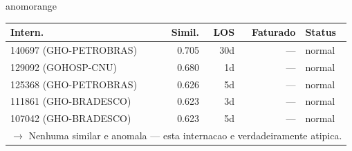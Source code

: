 \documentclass[a4paper,10pt]{article}
\begin{document}
\begin{anomalycard}[Internacao 165832 | GHO-PETROBRAS | ALTO (z=3.30)]{anomorange}
\begin{tabular}{l r r r l}\toprule\textbf{Intern.} & \textbf{Simil.} & \textbf{LOS} & \textbf{Faturado} & \textbf{Status} \\\midrule
140697 (GHO-PETROBRAS) & 0.705 & 30d & --- & \textcolor{jcubeblue}{normal} \\
129092 (GOHOSP-CNU) & 0.680 & 1d & --- & \textcolor{jcubeblue}{normal} \\
125368 (GHO-PETROBRAS) & 0.626 & 5d & --- & \textcolor{jcubeblue}{normal} \\
111861 (GHO-BRADESCO) & 0.623 & 3d & --- & \textcolor{jcubeblue}{normal} \\
107042 (GHO-BRADESCO) & 0.623 & 5d & --- & \textcolor{jcubeblue}{normal} \\
\multicolumn{5}{l}{\textcolor{jcubeblue}{\small $\rightarrow$ Nenhuma similar e anomala --- esta internacao e verdadeiramente atipica.}} \\
\bottomrule\end{tabular}



\end{anomalycard}

\newpage
\end{document}
